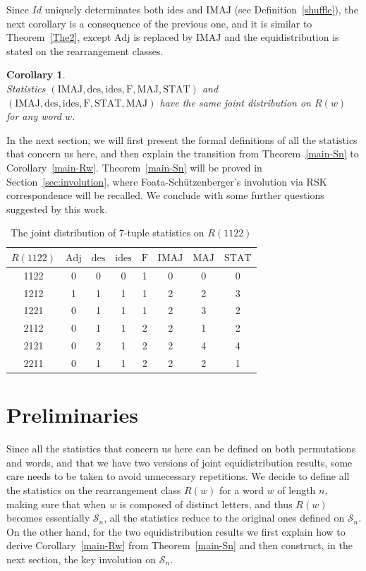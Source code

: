 \documentclass[12pt]{amsart}
\numberwithin{equation}{section}
\theoremstyle{plain}
\newtheorem{corollary}[theorem]{Corollary}
\theoremstyle{definition}
\def\MAJ{\mathrm{MAJ}}
\def\STAT{\mathrm{STAT}}
\def\F{\mathrm{F}}
\def\IMAJ{\mathrm{IMAJ}}
\def\des{\mathrm{des}}
\def\ides{\mathrm{ides}}
\def\Adj{\mathrm{Adj}}
\def\SS{\mathcal{S}}
\begin{document}
Since $Id$ uniquely determinates both $\ides$ and $\IMAJ$ (see Definition~\ref{shuffle}), the next corollary is a consequence of the previous one, and it is similar to Theorem~\ref{The2}, except
$\Adj$ is replaced by $\IMAJ$ and the equidistribution
is stated on the rearrangement classes.
\begin{corollary}$\ $\\
Statistics $(\IMAJ, \des, \ides, \F, \MAJ, \STAT)$ and
$(\IMAJ, \des, \ides, \F, \STAT, \MAJ)$ have the same joint distribution on $R(w)$ for any word $w$.
\end{corollary}


In the next section, we will first present the formal definitions of all the statistics that concern us here, and then explain the transition from Theorem~\ref{main-Sn} to Corollary~\ref{main-Rw}. Theorem~\ref{main-Sn} will be proved in Section~\ref{sec:involution}, where Foata-Sch\"{u}tzenberger's involution via RSK correspondence will be recalled. We conclude with some further questions suggested by this work.

\begin{table}[htbp]
\centering \caption{The joint distribution of $7$-tuple statistics on $R(1122)$}
\begin{tabular}{|c||c|c|c|c|c|c|c|}
\hline
$R(1122)$ & $\Adj$ & $\des$ & $\ides$ & $\F$ & $\IMAJ$ & $\MAJ$ & $\STAT$\\
\hline
1122 & 0 & 0 & 0 & 1 & 0 & 0 & 0\\
\hline
1212 & 1 & 1 & 1 & 1 & 2 & 2 & 3\\
\hline
1221 & 0 & 1 & 1 & 1 & 2 & 3 & 2\\
\hline
2112 & 0 & 1 & 1 & 2 & 2 & 1 & 2\\
\hline
2121 & 0 & 2 & 1 & 2 & 2 & 4 & 4\\
\hline
2211 & 0 & 1 & 1 & 2 & 2 & 2 & 1\\
\hline
\end{tabular}
\label{1122}
\end{table}



\section{Preliminaries}\label{sec:pre}

Since all the statistics that concern us here can be defined on both permutations and words, and that we have two versions of joint equidistribution results, some care needs to be taken to avoid unnecessary repetitions. We decide to define all the statistics on the rearrangement class $R(w)$ for a word $w$ of length $n$, making sure that when $w$ is composed of distinct letters, and thus $R(w)$ becomes essentially $\SS_n$, all the statistics reduce to the original ones defined on $\SS_n$. On the other hand, for the two equidistribution results we first explain how to derive Corollary~\ref{main-Rw} from Theorem~\ref{main-Sn} and then construct, in the next section, the key involution on $\SS_n$.
\end{document}
